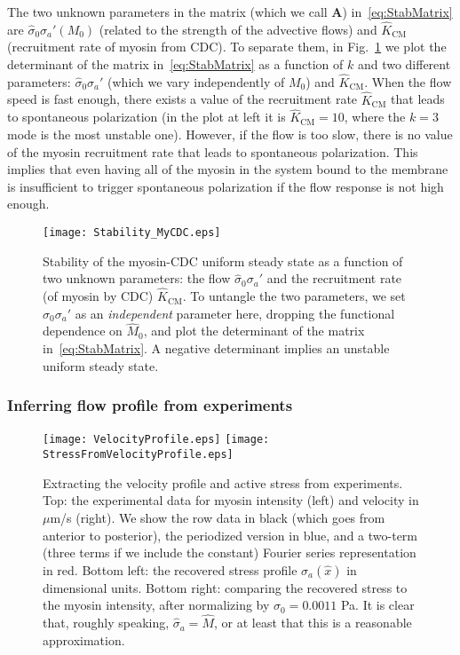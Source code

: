 \documentclass[11pt]{article}
\newcommand{\M}[1]{\boldsymbol{#1}}
\newcommand{\6}[1]{#1_{\text{6}}}
\newcommand{\3}[1]{#1_{\text{3}}}
\begin{document}
The two unknown parameters in the matrix (which we call $\M{A}$) in\ \eqref{eq:StabMatrix} are $\hat{\sigma}_0\sigma_a'\left(M_0\right)$ (related to the strength of the advective flows) and $ \hat{K}_\text{CM}$ (recruitment rate of myosin from CDC). To separate them, in Fig.\ \ref{fig:StabMyCDC} we plot the determinant of the matrix in\ \eqref{eq:StabMatrix} as a function of $k$ and two different parameters: $\hat{\sigma}_0 \sigma_a'$ (which we vary independently of $M_0$) and $\hat{K}_\text{CM}$. When the flow speed is fast enough, there exists a value of the recruitment rate $\hat{K}_\text{CM}$ that leads to spontaneous polarization (in the plot at left it is $\hat{K}_\text{CM}=10$, where the $k=3$ mode is the most unstable one). However, if the flow is too slow, there is no value of the myosin recruitment rate that leads to spontaneous polarization. This implies that even having all of the myosin in the system bound to the membrane is insufficient to trigger spontaneous polarization if the flow response is not high enough.

\begin{figure}
\centering
\texttt{[image: Stability\_MyCDC.eps]}
\caption{\label{fig:StabMyCDC} Stability of the myosin-CDC uniform steady state as a function of two unknown parameters: the flow $\hat{\sigma}_0 \sigma_a'$ and the recruitment rate (of myosin by CDC) $\hat{K}_\text{CM}$. To untangle the two parameters, we set $\hat{\sigma}_0 \sigma_a'$ as an \emph{independent} parameter here, dropping the functional dependence on $\hat M_0$, and plot the determinant of the matrix in\ \eqref{eq:StabMatrix}. A negative determinant implies an unstable uniform steady state. }
\end{figure}

\subsubsection{Inferring flow profile from experiments \label{sec:MyVelFit}}
\begin{figure}
\centering
\texttt{[image: VelocityProfile.eps]}
\texttt{[image: StressFromVelocityProfile.eps]}
\caption{\label{fig:VelProf} Extracting the velocity profile and active stress from experiments. Top: the experimental data for myosin intensity (left) and velocity in $\mu$m/s (right). We show the row data in black (which goes from anterior to posterior), the periodized version in blue, and a two-term (three terms if we include the constant) Fourier series representation in red. Bottom left: the recovered stress profile $\sigma_a(\hat x)$ in dimensional units. Bottom right: comparing the recovered stress to the myosin intensity, after normalizing by $\sigma_0=0.0011$ Pa. It is clear that, roughly speaking, $\hat \sigma_a = \hat M$, or at least that this is a reasonable approximation.}
\end{figure}
\end{document}
